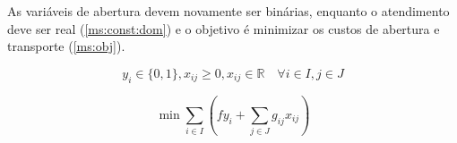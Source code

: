\documentclass[]{article}
\begin{document}
	As variáveis de abertura devem novamente ser binárias, enquanto o atendimento deve ser real (\ref{ms:const:dom}) 
	e o objetivo é minimizar os custos de abertura e transporte (\ref{ms:obj}).
	
	\begin{equation}
		\label{ms:const:dom}		
		y_i \in \{0, 1\}, 
		x_{ij} \ge 0, x_{ij} \in \mathbb{R}
		\quad
		\forall i \in I, j \in J		
	\end{equation}	
	
	\begin{equation}
		\label{ms:obj}		
		\min \sum_{i \in I} 
		(
		f y_i + \sum_{j \in J} g_{ij} x_{ij}
		)
	\end{equation}
\end{document}
